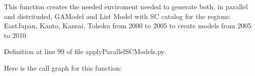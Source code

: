 \begin{DoxyVerb}This function creates the needed enviroment needed to generate both, in parallel and distrituded,
 GAModel and List Model  with SC catalog
for the regions: EastJapan, Kanto, Kansai, Tohoku
from 2000 to 2005 to create models from 2005 to 2010
\end{DoxyVerb}
 

Definition at line 99 of file apply\+Parallel\+S\+C\+Models.\+py.

Here is the call graph for this function\+:
